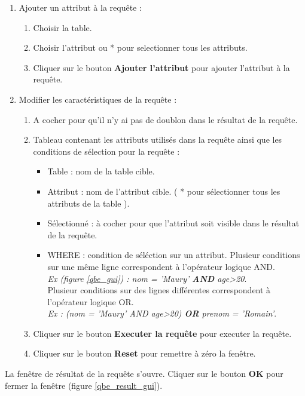 \begin{enumerate}
\item Ajouter un attribut à la requête :
\begin{enumerate}
\item Choisir la table.
\item Choisir l'attribut ou * pour selectionner tous les attributs.
\item Cliquer sur le bouton \textbf{Ajouter l'attribut} pour ajouter l'attribut à la requête.
\end{enumerate}
\item Modifier les caractéristiques de la requête :
\begin{enumerate}
\item A cocher pour qu'il n'y ai pas de doublon dans le résultat de la requête.
\item Tableau contenant les attributs utilisés dans la requête ainsi que les conditions de sélection pour la requête :
\begin{itemize}
\item Table : nom de la table cible.
\item Attribut : nom de l'attribut cible. ( * pour sélectionner tous les attributs de la table ).
\item Sélectionné : à cocher pour que l'attribut soit visible dans le résultat de la requête.
\item WHERE : condition de séléction sur un attribut. 
Plusieur conditions sur une même ligne correspondent à l'opérateur logique AND. \\
\textit{Ex (figure \ref{qbe_gui}) : nom = 'Maury' \textbf{AND} age>20}.\\
Plusieur conditions sur des lignes différentes correspondent à l'opérateur logique OR.\\
 \textit{Ex : (nom = 'Maury' AND age>20) \textbf{OR} prenom = 'Romain'}.\\
\end{itemize}
\item Cliquer sur le bouton \textbf{Executer la requête} pour executer la requête.
\item Cliquer sur le bouton \textbf{Reset} pour remettre à zéro la fenêtre.
\end{enumerate}
\end{enumerate}

La fenêtre de résultat de la requête s'ouvre. Cliquer sur le bouton \textbf{OK} pour fermer la fenêtre (figure \ref{qbe_result_gui}).

